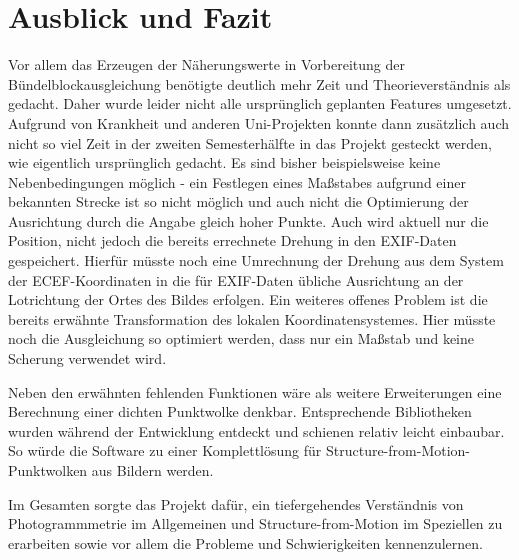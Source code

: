 \documentclass[./00PhotoBox.tex]{subfiles}
\begin{document}
\chapter{Ausblick und Fazit}
Vor allem das Erzeugen der Näherungswerte in Vorbereitung der Bündelblockausgleich\-ung benötigte deutlich mehr Zeit und Theorieverständnis als gedacht. Daher wurde leider nicht alle ursprünglich geplanten Features umgesetzt. Aufgrund von Krankheit und anderen Uni-Projekten konnte dann zusätzlich auch nicht so viel Zeit in der zweiten Semesterhälfte in das Projekt gesteckt werden, wie eigentlich ursprünglich gedacht. Es sind bisher beispielsweise keine Nebenbedingungen möglich - ein Festlegen eines Maßstabes aufgrund einer bekannten Strecke ist so nicht möglich und auch nicht die Optimierung der Ausrichtung durch die Angabe gleich hoher Punkte. Auch wird aktuell nur die Position, nicht jedoch die bereits errechnete Drehung in den EXIF-Daten gespeichert. Hierfür müsste noch eine Umrechnung der Drehung aus dem System der ECEF-Koordinaten in die für EXIF-Daten übliche Ausrichtung an der Lotrichtung der Ortes des Bildes erfolgen. Ein weiteres offenes Problem ist die bereits erwähnte Transformation des lokalen Koordinatensystemes. Hier müsste noch die Ausgleichung so optimiert werden, dass nur ein Maßstab und keine Scherung verwendet wird.

Neben den erwähnten fehlenden Funktionen wäre als weitere Erweiterungen eine Berechnung einer dichten Punktwolke denkbar. Entsprechende Bibliotheken wurden währ\-end der Entwicklung entdeckt und schienen relativ leicht einbaubar. So würde die Software zu einer Komplettlösung für Structure-from-Motion-Punktwolken aus Bildern werden.

Im Gesamten sorgte das Projekt dafür, ein tiefergehendes Verständnis von Photogrammmetrie im Allgemeinen und Structure-from-Motion im Speziellen zu erarbeiten sowie vor allem die Probleme und Schwierigkeiten kennenzulernen.

\biblio
\end{document}

